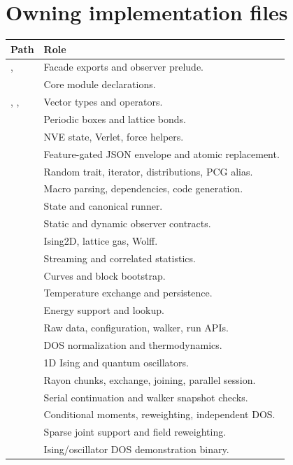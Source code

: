 \documentclass[11pt,a4paper,oneside]{report}
\begin{document}
\section{Owning implementation files}
\begin{longtable}{@{}P{0.54\textwidth}P{0.40\textwidth}@{}}
\toprule Path & Role\\\midrule\endhead
{},  & Facade exports and observer prelude.\\
 & Core module declarations.\\
, ,  & Vector types and operators.\\
 & Periodic boxes and lattice bonds.\\
 & NVE state, Verlet, force helpers.\\
 & Feature-gated JSON envelope and atomic replacement.\\
 & Random trait, iterator, distributions, PCG alias.\\
 & Macro parsing, dependencies, code generation.\\
 & State and canonical runner.\\
 & Static and dynamic observer contracts.\\
 & Ising2D, lattice gas, Wolff.\\
 & Streaming and correlated statistics.\\
 & Curves and block bootstrap.\\
 & Temperature exchange and persistence.\\
 & Energy support and lookup.\\
 & Raw data, configuration, walker, run APIs.\\
 & DOS normalization and thermodynamics.\\
 & 1D Ising and quantum oscillators.\\
 & Rayon chunks, exchange, joining, parallel session.\\
 & Serial continuation and walker snapshot checks.\\
 & Conditional moments, reweighting, independent DOS.\\
 & Sparse joint support and field reweighting.\\
 & Ising/oscillator DOS demonstration binary.\\
\bottomrule
\end{longtable}
\end{document}
